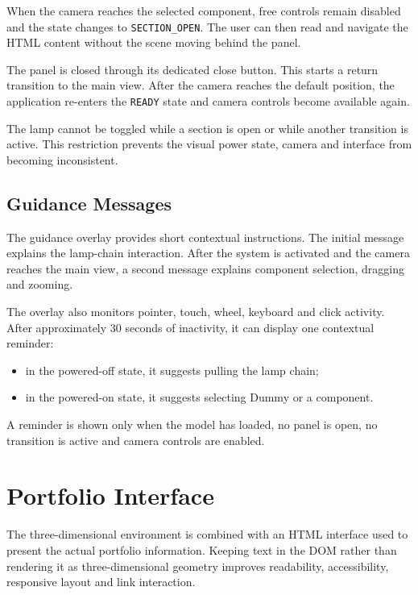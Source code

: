 \documentclass{report}
\begin{document}
When the camera reaches the selected component, free controls remain
disabled and the state changes to \texttt{SECTION\_OPEN}. The user can
then read and navigate the HTML content without the scene moving behind
the panel.

The panel is closed through its dedicated close button. This starts a
return transition to the main view. After the camera reaches the default
position, the application re-enters the \texttt{READY} state and camera
controls become available again.

The lamp cannot be toggled while a section is open or while another
transition is active. This restriction prevents the visual power state,
camera and interface from becoming inconsistent.

\subsection{Guidance Messages}

The guidance overlay provides short contextual instructions. The initial
message explains the lamp-chain interaction. After the system is
activated and the camera reaches the main view, a second message explains
component selection, dragging and zooming.

The overlay also monitors pointer, touch, wheel, keyboard and click
activity. After approximately \(30\) seconds of inactivity, it can
display one contextual reminder:

\begin{itemize}
    \item in the powered-off state, it suggests pulling the lamp chain;
    \item in the powered-on state, it suggests selecting Dummy or a
    component.
\end{itemize}

A reminder is shown only when the model has loaded, no panel is open, no
transition is active and camera controls are enabled.

\section{Portfolio Interface}

The three-dimensional environment is combined with an HTML interface
used to present the actual portfolio information. Keeping text in the
DOM rather than rendering it as three-dimensional geometry improves
readability, accessibility, responsive layout and link interaction.
\end{document}
